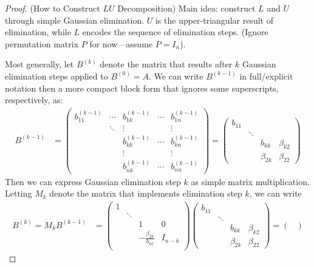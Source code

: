 \documentclass[12pt]{article}
\numberwithin{equation}{section} %
\theoremstyle{plain}
\theoremstyle{definition}
\theoremstyle{remark}
\begin{document}
\begin{proof}(How to Construct $LU$ Decomposition)
Main idea:
construct $L$ and $U$ through simple Gaussian elimination.
$U$ is the upper-triangular result of elimination, while
$L$ encodes the sequence of elimination steps.
(Ignore permutation matrix $P$ for now---assume $P=I_n$).

Most generally, let $B^{(k)}$ denote the matrix that results after $k$
Gaussian elimination steps applied to $B^{(0)}=A$. We can write
$B^{(k-1)}$ in full/explicit notation then a more compact block form
that ignores some superscripts, respectively, as:
\begin{align*}
  B^{(k-1)}
  &=
  \begin{pmatrix}
    b_{11}^{(k-1)} & \cdots & b_{1k}^{(k-1)} & \cdots & b_{1n}^{(k-1)}\\
    & \ddots & \vdots  & & \vdots\\
    & & b_{kk}^{(k-1)} & \cdots & b_{kn}^{(k-1)} \\
    & & \vdots & & \vdots \\
    & & b_{nk}^{(k-1)} & \cdots & b_{nn}^{(k-1)}
  \end{pmatrix}
  =
  \begin{pmatrix}
    b_{11} & \\
    & \ddots &  & \\
    & & b_{kk} & \beta_{k2} \\
    & & \beta_{2k} & \beta_{22}
  \end{pmatrix}
\end{align*}
Then we can express Gaussian elimination step $k$ as simple matrix
multiplication. Letting $M_k$ denote the matrix that implements
elimination step $k$, we can write
\begin{align*}
  B^{(k)} = M_k B^{(k-1)}
  &=
  \begin{pmatrix}
    1 & \\
      & \ddots & & \\
      &  & 1 & 0 \\
      &  & -\frac{\beta_{2k}}{b_{kk}} & I_{n-k}\\
  \end{pmatrix}
  \begin{pmatrix}
    b_{11} & \\
    & \ddots &  & \\
    & & b_{kk} & \beta_{k2} \\
    & & \beta_{2k} & \beta_{22}
  \end{pmatrix}
  =
  \begin{pmatrix}

\end{pmatrix}
\end{align*}
\end{proof}
\end{document}
